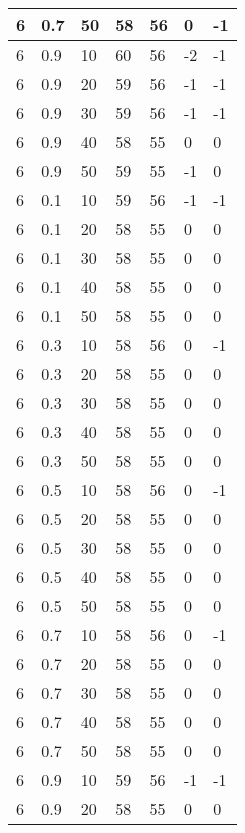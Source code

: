 \begin{longtable}{|l|l|l|l|l|l|l|}
		6     & 0.7 & 50   & 58 & 56 & 0   & -1  \\ \hline
		6     & 0.9 & 10   & 60 & 56 & -2  & -1  \\ \hline
		6     & 0.9 & 20   & 59 & 56 & -1  & -1  \\ \hline
		6     & 0.9 & 30   & 59 & 56 & -1  & -1  \\ \hline
		6     & 0.9 & 40   & 58 & 55 & 0   & 0   \\ \hline
		6     & 0.9 & 50   & 59 & 55 & -1  & 0   \\ \hline
		6     & 0.1 & 10   & 59 & 56 & -1  & -1  \\ \hline
		6     & 0.1 & 20   & 58 & 55 & 0   & 0   \\ \hline
		6     & 0.1 & 30   & 58 & 55 & 0   & 0   \\ \hline
		6     & 0.1 & 40   & 58 & 55 & 0   & 0   \\ \hline
		6     & 0.1 & 50   & 58 & 55 & 0   & 0   \\ \hline
		6     & 0.3 & 10   & 58 & 56 & 0   & -1  \\ \hline
		6     & 0.3 & 20   & 58 & 55 & 0   & 0   \\ \hline
		6     & 0.3 & 30   & 58 & 55 & 0   & 0   \\ \hline
		6     & 0.3 & 40   & 58 & 55 & 0   & 0   \\ \hline
		6     & 0.3 & 50   & 58 & 55 & 0   & 0   \\ \hline
		6     & 0.5 & 10   & 58 & 56 & 0   & -1  \\ \hline
		6     & 0.5 & 20   & 58 & 55 & 0   & 0   \\ \hline
		6     & 0.5 & 30   & 58 & 55 & 0   & 0   \\ \hline
		6     & 0.5 & 40   & 58 & 55 & 0   & 0   \\ \hline
		6     & 0.5 & 50   & 58 & 55 & 0   & 0   \\ \hline
		6     & 0.7 & 10   & 58 & 56 & 0   & -1  \\ \hline
		6     & 0.7 & 20   & 58 & 55 & 0   & 0   \\ \hline
		6     & 0.7 & 30   & 58 & 55 & 0   & 0   \\ \hline
		6     & 0.7 & 40   & 58 & 55 & 0   & 0   \\ \hline
		6     & 0.7 & 50   & 58 & 55 & 0   & 0   \\ \hline
		6     & 0.9 & 10   & 59 & 56 & -1  & -1  \\ \hline
		6     & 0.9 & 20   & 58 & 55 & 0   & 0   \\ \hline

\end{longtable}
